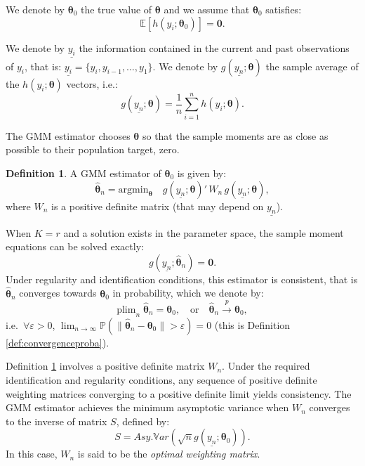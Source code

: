 \documentclass[
  11pt,
]{book}
\theoremstyle{definition}
\newtheorem{definition}{Definition}[chapter]
\theoremstyle{definition}
\theoremstyle{definition}
\theoremstyle{definition}
\theoremstyle{remark}
\begin{document}
We denote by \(\boldsymbol\theta_0\) the true value of \(\boldsymbol\theta\) and we assume that \(\boldsymbol\theta_0\) satisfies:
\[
\mathbb{E}[h(y_i;\boldsymbol\theta_0)] = \mathbf{0}.
\]

We denote by \(\underline{y_i}\) the information contained in the current and past observations of \(y_i\), that is: \(\underline{y_i} = \{y_i,y_{i-1},\dots,y_1\}\). We denote by \(g(\underline{y_n};\boldsymbol\theta)\) the sample average of the \(h(y_i;\boldsymbol\theta)\) vectors, i.e.:
\[
g(\underline{y_n};\boldsymbol\theta) = \frac{1}{n} \sum_{i=1}^{n} h(y_i;\boldsymbol\theta).
\]

The GMM estimator chooses \(\boldsymbol\theta\) so that the sample moments are as close as possible to their population target, zero.

\begin{definition}
\protect\hypertarget{def:GMM}{}\label{def:GMM}A GMM estimator of \(\boldsymbol\theta_0\) is given by:
\[
\hat{\boldsymbol\theta}_n = \mbox{argmin}_{\boldsymbol\theta} \quad g(\underline{y_n};\boldsymbol\theta)'\, W_n \, g(\underline{y_n};\boldsymbol\theta),
\]
where \(W_n\) is a positive definite matrix (that may depend on \(\underline{y_n}\)).
\end{definition}

When \(K=r\) and a solution exists in the parameter space, the sample moment equations can be solved exactly:
\[
g(\underline{y_n};\hat{\boldsymbol\theta}_n) = \mathbf{0}.
\]
Under regularity and identification conditions, this estimator is consistent, that is \(\hat{\boldsymbol\theta}_{n}\) converges towards \(\boldsymbol\theta_0\) in probability, which we denote by:
\begin{equation}
\mbox{plim}_n\;\hat{\boldsymbol\theta}_{n}= \boldsymbol\theta_0,\quad \mbox{or} \quad\hat{\boldsymbol\theta}_{n} \overset{p}{\rightarrow} \boldsymbol\theta_0,\label{eq:consistGMM}
\end{equation}
i.e.~\(\forall \varepsilon>0\), \(\lim_{n \rightarrow \infty} \mathbb{P}(\|\hat{\boldsymbol\theta}_{n} - \boldsymbol\theta_0\|>\varepsilon) = 0\) (this is Definition \ref{def:convergenceproba}).

Definition \ref{def:GMM} involves a positive definite matrix \(W_n\). Under the required identification and regularity conditions, any sequence of positive definite weighting matrices converging to a positive definite limit yields consistency. The GMM estimator achieves the minimum asymptotic variance when \(W_n\) converges to the inverse of matrix \(S\), defined by:
\[
S = Asy.\mathbb{V}ar\left(\sqrt{n}g(\underline{y_n};\boldsymbol\theta_0)\right).
\]
In this case, \(W_n\) is said to be the \emph{optimal weighting matrix}.
\end{document}
